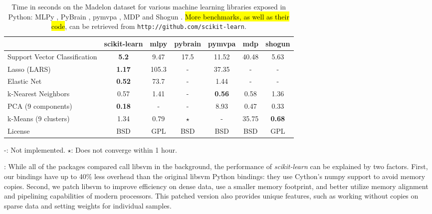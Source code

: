 \documentclass[twoside,11pt]{article}
\begin{document}
\begin{table}[t]
\small
\hspace*{.03\linewidth}%
\begin{tabular}{l c c c c c c}
\hline\hline %
 & scikit-learn & mlpy & pybrain & pymvpa &  mdp & shogun \\ [0.5ex]
\hline
Support Vector Classification & {\bf 5.2} & 9.47 & 17.5 & 11.52 & 40.48 & 5.63 \\
Lasso (LARS) & {\bf 1.17} & 105.3   & - &  37.35 & - & - \\
Elastic Net & {\bf 0.52} & 73.7 & -  &  1.44  & -  & - \\
k-Nearest Neighbors & 0.57 & 1.41 & - &  {\bf 0.56} & 0.58 & 1.36 \\
PCA (9 components) & {\bf 0.18} & - & - & 8.93  & 0.47 & 0.33 \\
k-Means (9 clusters) & 1.34 &  0.79 & $\star$ & -  & 35.75 & {\bf 0.68} \\
License &  BSD & GPL & BSD  &  BSD  & BSD  & GPL \\
\hline
\end{tabular}

-: Not implemented. \hfill
$\star$: Does not converge within 1 hour.

\vspace*{-1.5ex}
\caption{\small
Time in seconds on the Madelon dataset for various machine learning libraries exposed in Python:
MLPy \citep{albanese2008}, PyBrain \citep{schaul2010}, pymvpa
\citep{hanke2009}, MDP \citep{zito2008} and Shogun
\citep{sonnenburg2010}. 
\hl{More benchmarks, as well as their code}, can be retrieved from {\tt http://github.com/scikit-learn}.
\vspace*{-1.5em}\label{tab:comparisons}
}
\end{table}

\smallskip {}:
%
While all of the packages compared call libsvm in the
background, the
performance of \emph{scikit-learn} can be explained by two factors.
First, our bindings have up to 40\% less overhead than the original
libsvm Python bindings: they use Cython's numpy support
to avoid memory copies. Second, we patch libsvm to improve efficiency
on dense data, use a smaller memory footprint, and better utilize memory
alignment and pipelining capabilities of modern processors. This patched
version also provides unique features, such as working without copies on
sparse data and setting weights for individual samples.
\end{document}
